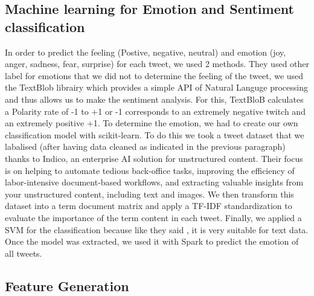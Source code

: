 \documentclass{acmtog} %
\begin{document}
\subsection{Machine learning for Emotion and Sentiment classification}
\label{subsub:ml}

In order to predict the feeling (Postive, negative, neutral) and emotion (joy, anger, sadness, fear, surprise) for each tweet, we used 2 methods. They used other label for emotions that we did not to determine the feeling of the tweet, we used the TextBlob librairy which provides a simple API of Natural Languge processing and thus allows us to make the sentiment analysis. For this, TextBloB calculates a Polarity rate of -1 to +1 or -1 corresponds to an extremely negative twitch and an extremely positive +1.
To determine the emotion, we had to create our own classification model with scikit-learn.
To do this we took a tweet dataset that we labalised (after having data cleaned as indicated in the previous paragraph) thanks to Indico, an enterprise AI solution for unstructured content. Their focus is on helping to automate tedious back-office tasks, improving the efficiency of labor-intensive document-based workflows, and extracting valuable insights from your unstructured content, including text and images.  
We then transform this dataset into a term document matrix and apply a TF-IDF standardization to evaluate the importance of the term content in each tweet.
Finally, we applied a SVM for the classification because like they said \cite{Medhat14}, it is very suitable for text data.
Once the model was extracted, we used it with Spark to predict the emotion of all tweets.

\subsection{Feature Generation}
\label{subsub:featureGeneration}
\end{document}
